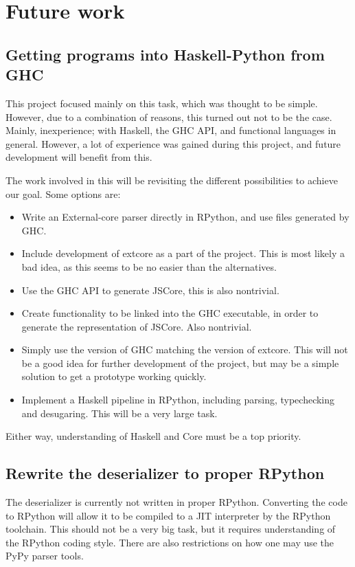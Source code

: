 \section{Future work}

\subsection{Getting programs into Haskell-Python from GHC}

This project focused mainly on this task, which was thought to be simple.
However, due to a combination of reasons, this turned out not to be the case.
Mainly, inexperience; with Haskell, the GHC API, and functional languages in 
general. However, a lot of experience was gained during this project, and
future development will benefit from this.

The work involved in this will be revisiting the different possibilities to
achieve our goal. Some options are:

\begin{itemize}
\item Write an External-core parser directly in RPython, and use files generated by GHC.
\item Include development of extcore as a part of the project. This is most likely a bad
idea, as this seems to be no easier than the alternatives.
\item Use the GHC API to generate JSCore, this is also nontrivial.
\item Create functionality to be linked into the GHC executable, in order to generate the
representation of JSCore. Also nontrivial.
\item Simply use the version of GHC matching the version of extcore. This will not be
a good idea for further development of the project, but may be a simple solution to get
a prototype working quickly.
\item Implement a Haskell pipeline in RPython, including parsing, typechecking and desugaring.
This will be a very large task.
\end{itemize}

Either way, understanding of Haskell and Core must be a top priority.

\subsection{Rewrite the deserializer to proper RPython}

The deserializer is currently not written in proper RPython. 
Converting the code to RPython will allow it to be compiled to a JIT interpreter by
the RPython toolchain. This should not be a very big task, but it requires understanding
of the RPython coding style. There are also restrictions on how one may use the PyPy parser
tools.

